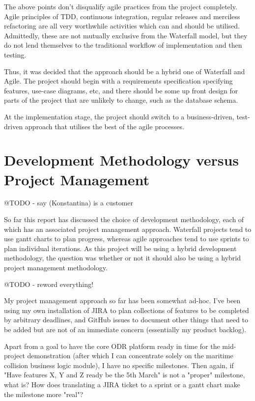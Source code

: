 The above points don't disqualify agile practices from the project completely. Agile principles of TDD, continuous integration, regular releases and merciless refactoring are all very worthwhile activities which can and should be utilised. Admittedly, these are not mutually exclusive from the Waterfall model, but they do not lend themselves to the traditional workflow of implementation and then testing.

Thus, it was decided that the approach should be a hybrid one of Waterfall and Agile. The project should begin with a requirements specification specifying features, use-case diagrams, etc, and there should be some up front design for parts of the project that are unlikely to change, such as the database schema.

At the implementation stage, the project should switch to a business-driven, test-driven approach that utilises the best of the agile processes.

\section{Development Methodology versus Project Management}

@TODO - say (Konstantina) is a customer 

So far this report has discussed the choice of development methodology, each of which has an associated project management approach. Waterfall projects tend to use gantt charts to plan progress, whereas agile approaches tend to use sprints to plan individual iterations. As this project will be using a hybrid development methodology, the question was whether or not it should also be using a hybrid project management methodology.

@TODO - reword everything!

My project management approach so far has been somewhat ad-hoc. I've been using my own installation of JIRA to plan collections of features to be completed by arbitrary deadlines, and GitHub issues to document other things that need to be added but are not of an immediate concern (essentially my product backlog).

Apart from a goal to have the core ODR platform ready in time for the mid-project demonstration (after which I can concentrate solely on the maritime collision business logic module), I have no specific milestones. Then again, if "Have features X, Y and Z ready be the 5th March" is not a "proper" milestone, what is? How does translating a JIRA ticket to a sprint or a gantt chart make the milestone more "real"?

